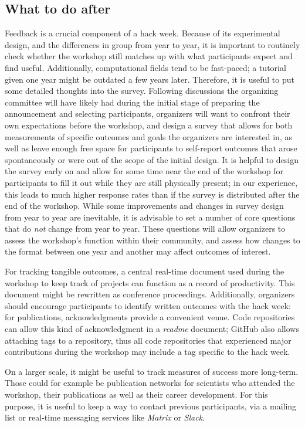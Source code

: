 \documentclass{aastex62}
\begin{document}
\subsection{What to do after}

Feedback is a crucial component of a hack week. Because of its experimental design, and the differences in group from year to year, it is important to routinely check whether the workshop still matches up with what participants expect and find useful. Additionally, computational fields tend to be fast-paced; a tutorial given one year might be outdated a few years later. Therefore, it is useful to put some detailed thoughts into the survey. Following discussions the organizing committee will have likely had during the initial stage of preparing the announcement and selecting participants, organizers will want to confront their own expectations before the workshop, and design a survey that allows for both measurements of specific outcomes and goals the organizers are interested in, as well as leave enough free space for participants to self-report outcomes that arose spontaneously or were out of the scope of the initial design. It is helpful to design the survey early on and allow for some time near the end of the workshop for participants to fill it out while they are still physically present; in our experience, this leads to much higher response rates than if the survey is distributed after the end of the workshop. While some improvements and changes in survey design from year to year are inevitable, it is advisable to set a number of core questions that do \textit{not} change from year to year. These questions will allow organizers to assess the workshop's function within their community, and assess how changes to the format between one year and another may affect outcomes of interest.

For tracking tangible outcomes, a central real-time document used during the workshop to keep track of projects can function as a record of productivity. This document might be rewritten as conference proceedings. Additionally, organizers should encourage participants to identify written outcomes with the hack week: for publications, acknowledgments provide a convenient venue. Code repositories can allow this kind of acknowledgment in a \textit{readme} document; GitHub also allows attaching tags to a repository, thus all code repositories that experienced major contributions during the workshop may include a tag specific to the hack week.

On a larger scale, it might be useful to track measures of success more long-term. Those could for example be publication networks for scientists who attended the workshop, their publications as well as their career development. For this purpose, it is useful to keep a way to contact previous participants, via a mailing list or real-time messaging services like \textit{Matrix} or \textit{Slack}.



\end{document}
